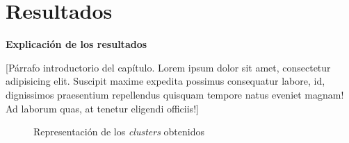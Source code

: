 \chapter{Resultados}\label{chap:resultados}
\textbf{Explicación de los resultados}

[Párrafo introductorio del capítulo. Lorem ipsum dolor sit amet, consectetur adipisicing elit. Suscipit maxime expedita possimus consequatur labore, id, dignissimos praesentium repellendus quisquam tempore natus eveniet magnam! Ad laborum quas, at tenetur eligendi officiis!]

\begin{figure}[h]
    \centering
    \caption{Representación de los \emph{clusters} obtenidos}
    \label{fig:clusters}
\end{figure}
